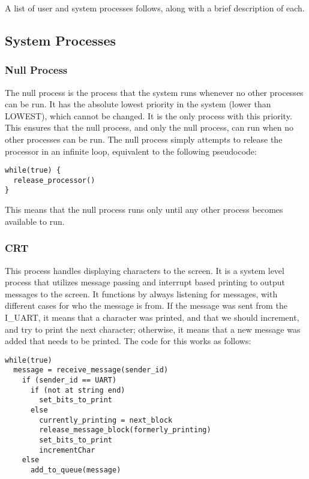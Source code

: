 \documentclass[12pt]{article}
\begin{document}
A list of user and system processes follows, along with a brief description of each.

\subsection{System Processes}\label{systemp}
\subsubsection{Null Process}\label{nullp}
The null process is the process that the system runs whenever no other processes can be run. It has the absolute lowest priority in the system (lower than LOWEST), which cannot be changed. It is the only process with this priority. This ensures that the null process, and only the null process, can run when no other processes can be run. The null process simply attempts to release the processor in an infinite loop, equivalent to the following pseudocode:
\begin{lstlisting}
while(true) {
  release_processor()
}
\end{lstlisting}

This means that the null process runs only until any other process becomes available to run.

\subsubsection{CRT} \label{CRTp}
This process handles displaying characters to the screen. It is a system level process that utilizes message passing and interrupt based printing to output messages to the screen. It functions by always listening for messages, with different cases for who the message is from. If the message was sent from the I\_UART, it means that a character was printed, and that we should increment, and try to print the next character; otherwise, it means that a new message was added that needs to be printed. The code for this works as follows:

\begin{lstlisting}[breaklines=true]
while(true)
  message = receive_message(sender_id)
    if (sender_id == UART)
      if (not at string end)
        set_bits_to_print
      else
        currently_printing = next_block
        release_message_block(formerly_printing)
        set_bits_to_print
        incrementChar
    else
      add_to_queue(message)
\end{lstlisting}
\end{document}
